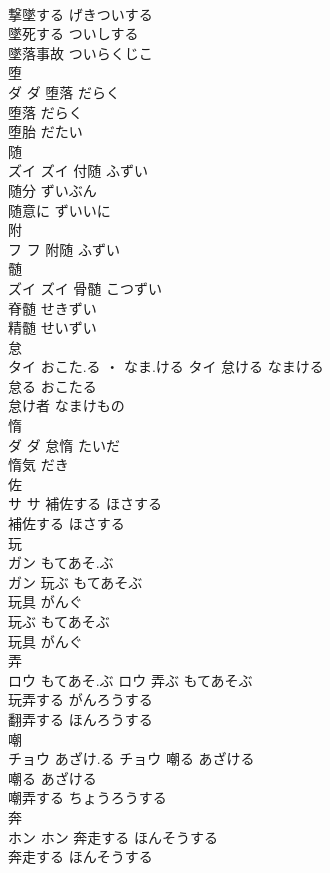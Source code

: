 \documentclass[8pt]{extreport}
\begin{document}
\begin{CJK}{UTF8}{min}
\\	撃墜する	げきついする	
\\	墜死する	ついしする	
\\	墜落事故	ついらくじこ	
\\	堕	
\\	ダ		ダ	堕落	だらく	
\\	堕落	だらく	
\\	堕胎	だたい	
\\	随	
\\	ズイ		ズイ	付随	ふずい	
\\	随分	ずいぶん	
\\	随意に	ずいいに	
\\	附	
\\	フ		フ													附随	ふずい	
\\	髄	
\\	ズイ		ズイ	骨髄	こつずい	
\\	脊髄	せきずい	
\\	精髄	せいずい	
\\	怠	
\\	タイ	おこた.る ・ なま.ける	タイ	怠ける	なまける	
\\	怠る	おこたる	
\\	怠け者	なまけもの	
\\	惰	
\\	ダ		ダ	怠惰	たいだ	
\\	惰気	だき	
\\	佐	
\\	サ		サ	補佐する	ほさする	
\\	補佐する	ほさする	
\\	玩	
\\	ガン	もてあそ.ぶ
\\	ガン	玩ぶ	もてあそぶ	
\\	玩具	がんぐ	
\\	玩ぶ	もてあそぶ	
\\	玩具	がんぐ	
\\	弄	
\\	ロウ	もてあそ.ぶ	ロウ	弄ぶ	もてあそぶ	
\\	玩弄する	がんろうする	
\\	翻弄する	ほんろうする	
\\	嘲	
\\	チョウ	あざけ.る	チョウ	嘲る	あざける	
\\	嘲る	あざける	
\\	嘲弄する	ちょうろうする	
\\	奔	
\\	ホン		ホン	奔走する	ほんそうする	
\\	奔走する	ほんそうする	

\end{CJK}
\end{document}

